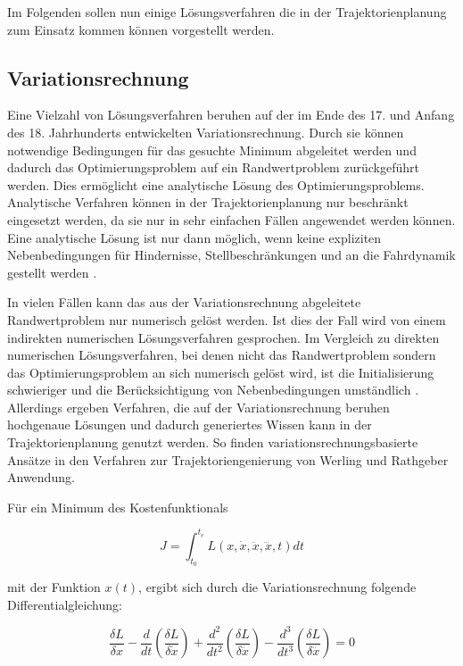 Im Folgenden sollen nun einige L\"osungsverfahren die in der Trajektorienplanung zum Einsatz kommen k\"onnen vorgestellt werden.



\subsection{Variationsrechnung}
\label{sec:Varationsrechnung}
Eine Vielzahl von L\"osungsverfahren beruhen auf der im Ende des 17. und Anfang des 18. Jahrhunderts entwickelten Variationsrechnung. 
Durch sie k\"onnen notwendige Bedingungen f\"ur das gesuchte Minimum abgeleitet werden und dadurch das Optimierungsproblem auf ein Randwertproblem zur\"uckgef\"uhrt werden.
Dies erm\"oglicht eine analytische L\"osung des Optimierungsproblems.
Analytische Verfahren k\"onnen in der Trajektorienplanung nur beschr\"ankt eingesetzt werden, da sie nur in sehr einfachen F\"allen angewendet werden k\"onnen. 
Eine analytische L\"osung ist nur dann m\"oglich, wenn keine expliziten Nebenbedingungen f\"ur Hindernisse, Stellbeschr\"ankungen und an die Fahrdynamik gestellt werden \cite{Ziegler2017}. \cite{Papageorgiou1991}

In vielen F\"allen kann das aus der Variationsrechnung abgeleitete Randwertproblem nur numerisch gel\"ost werden.
Ist dies der Fall wird von einem indirekten numerischen L\"osungsverfahren gesprochen.
Im Vergleich zu direkten numerischen L\"osungsverfahren, bei denen nicht das Randwertproblem sondern das Optimierungsproblem an sich numerisch gel\"ost wird, ist die Initialisierung schwieriger und die Ber\"ucksichtigung von Nebenbedingungen umst\"andlich \cite{Papageorgiou1991}. 
Allerdings ergeben Verfahren, die auf der Variationsrechnung beruhen hochgenaue L\"osungen und dadurch generiertes Wissen kann in der Trajektorienplanung genutzt werden.
So finden variationsrechnungsbasierte Ans\"atze in den Verfahren zur Trajektoriengenierung von Werling \cite{Werling2011} und Rathgeber \cite{Rathgeber2016} Anwendung. \cite{Papageorgiou1991}

F\"ur ein Minimum des Kostenfunktionals

\begin{equation} 
  J = \int_{t_0}^{t_e} L( x, \dot{x}, \ddot{x}, \dddot{x}, t) dt
  \label{eq:Kostenfunktional2}
\end{equation} 

mit der Funktion \(x(t)\), ergibt sich durch die Variationsrechnung folgende Differentialgleichung:

\begin{equation} 
  \frac{\delta L}{\delta x} - \frac{d}{dt} \left(\frac{\delta L}{\delta \dot{x}}\right) + \frac{d^2}{dt^2} \left(\frac{\delta L}{\delta \ddot{x}}\right) - \frac{d^3}{dt^3} \left(\frac{\delta L}{\delta \dddot{x}}\right) = 0
  \label{eq:EulerPoisson}
\end{equation} 

